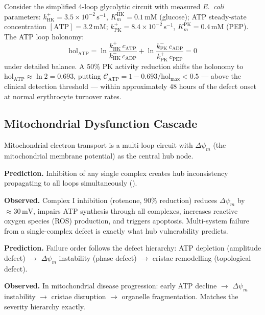 \begin{example}
\label{ex:ch08-glycolysis}
Consider the simplified 4-loop glycolytic circuit with measured
\textit{E.\ coli} parameters: $k_{\mathrm{HK}}^{+} = 3.5 \times 10^{-2}\,\mathrm{s}^{-1}$,
$K_m^{\mathrm{HK}} = 0.1\,\mathrm{mM}$ (glucose); ATP steady-state
concentration $[\mathrm{ATP}] = 3.2\,\mathrm{mM}$;
$k_{\mathrm{PK}}^{+} = 8.4 \times 10^{-2}\,\mathrm{s}^{-1}$,
$K_m^{\mathrm{PK}} = 0.4\,\mathrm{mM}$ (PEP).  The ATP loop holonomy:
\begin{equation}
  \mathrm{hol}_{\mathrm{ATP}}
  = \ln\frac{k_{\mathrm{HK}}^{+}\,c_{\mathrm{ATP}}}{k_{\mathrm{HK}}^{-}\,c_{\mathrm{ADP}}}
  + \ln\frac{k_{\mathrm{PK}}^{-}\,c_{\mathrm{ADP}}}{k_{\mathrm{PK}}^{+}\,c_{\mathrm{PEP}}}
  = 0
\end{equation}
under detailed balance.  A 50\% PK activity reduction shifts the holonomy
to $\mathrm{hol}_{\mathrm{ATP}} \approx \ln 2 = 0.693$, putting
$\mathcal{C}_{\mathrm{ATP}} = 1 - 0.693/\mathrm{hol}_{\max} < 0.5$ ---
above the clinical detection threshold --- within approximately 48 hours
of the defect onset at normal erythrocyte turnover rates.
\end{example}

\subsection{Mitochondrial Dysfunction Cascade}

Mitochondrial electron transport is a multi-loop circuit with $\Delta\psi_m$
(the mitochondrial membrane potential) as the central hub node.

\textbf{Prediction.}  Inhibition of any single complex creates hub
inconsistency propagating to all loops simultaneously
().

\textbf{Observed.}  Complex I inhibition (rotenone, $90\%$ reduction)
reduces $\Delta\psi_m$ by $\approx 30\,\mathrm{mV}$, impairs ATP synthesis
through all complexes, increases reactive oxygen species (ROS) production,
and triggers apoptosis.  Multi-system failure from a single-complex defect
is exactly what hub vulnerability predicts.

\textbf{Prediction.}  Failure order follows the defect hierarchy: ATP
depletion (amplitude defect) $\to$ $\Delta\psi_m$ instability (phase
defect) $\to$ cristae remodelling (topological defect).

\textbf{Observed.}  In mitochondrial disease progression: early ATP
decline $\to$ $\Delta\psi_m$ instability $\to$ cristae disruption $\to$
organelle fragmentation.  Matches the severity hierarchy exactly.

